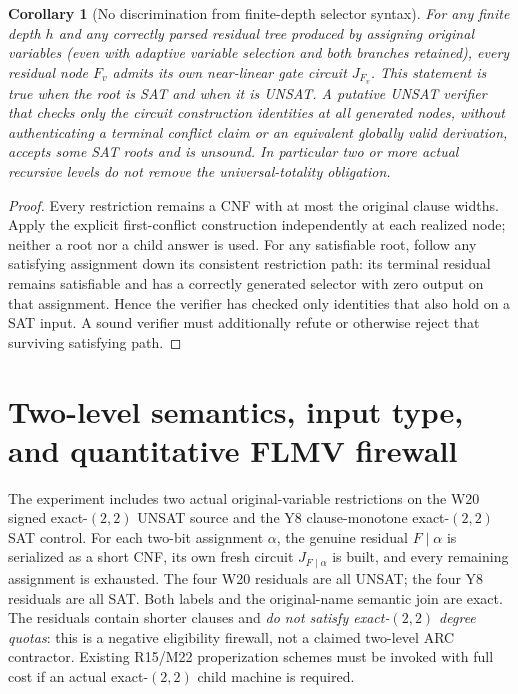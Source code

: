 \documentclass[11pt]{article}
\newtheorem{corollary}[theorem]{Corollary}
\begin{document}
\begin{corollary}[No discrimination from finite-depth selector syntax]\label{cor:depth}
For any finite depth $h$ and any correctly parsed residual tree produced by assigning original variables (even with adaptive variable selection and both branches retained), every residual node $F_v$ admits its own near-linear gate circuit $J_{F_v}$. This statement is true when the root is SAT and when it is UNSAT. A putative UNSAT verifier that checks only the circuit construction identities at all generated nodes, without authenticating a terminal conflict claim or an equivalent globally valid derivation, accepts some SAT roots and is unsound. In particular two or more actual recursive levels do not remove the universal-totality obligation.
\end{corollary}
\begin{proof}
Every restriction remains a CNF with at most the original clause widths. Apply the explicit first-conflict construction independently at each realized node; neither a root nor a child answer is used. For any satisfiable root, follow any satisfying assignment down its consistent restriction path: its terminal residual remains satisfiable and has a correctly generated selector with zero output on that assignment. Hence the verifier has checked only identities that also hold on a SAT input. A sound verifier must additionally refute or otherwise reject that surviving satisfying path.\end{proof}

\section{Two-level semantics, input type, and quantitative FLMV firewall}
The experiment includes two actual original-variable restrictions on the W20 signed exact-$(2,2)$ UNSAT source and the Y8 clause-monotone exact-$(2,2)$ SAT control. For each two-bit assignment $\alpha$, the genuine residual $F\mid\alpha$ is serialized as a short CNF, its own fresh circuit $J_{F\mid\alpha}$ is built, and every remaining assignment is exhausted. The four W20 residuals are all UNSAT; the four Y8 residuals are all SAT. Both labels and the original-name semantic join are exact. The residuals contain shorter clauses and \emph{do not satisfy exact-$(2,2)$ degree quotas}: this is a negative eligibility firewall, not a claimed two-level ARC contractor. Existing R15/M22 properization schemes must be invoked with full cost if an actual exact-$(2,2)$ child machine is required.
\end{document}
